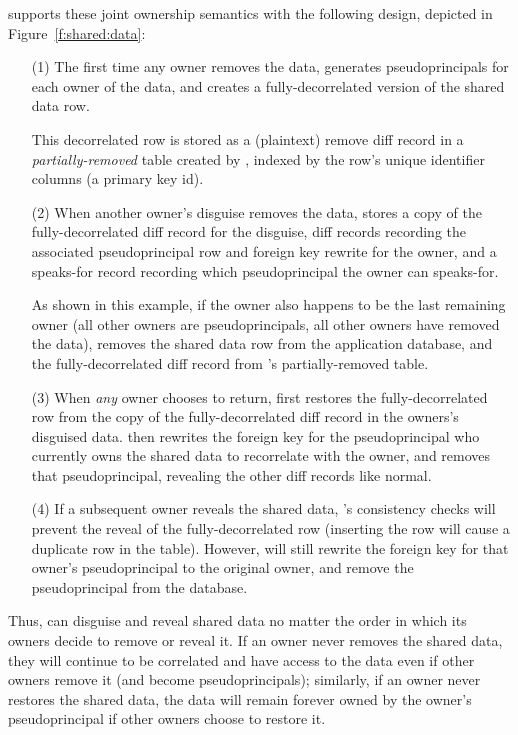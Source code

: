 \sys supports these joint ownership semantics with the following design,
depicted in Figure~\ref{f:shared:data}:
%
\begin{enumerate}
    \item[(1)] The first time any owner removes the data, \sys generates pseudoprincipals for
each owner of the data, and creates a fully-decorrelated version of the shared
data row. 

This decorrelated row is stored as a (plaintext) remove diff record in a
\emph{partially-removed} table created by \sys, indexed by the row's unique
identifier columns (\eg a primary key id).

\item[(2)]
When another owner's disguise removes the data, \sys stores a copy of the
fully-decorrelated diff record for the disguise, diff records recording the
associated pseudoprincipal row and foreign key rewrite for the owner, and a
speaks-for record recording which pseudoprincipal the owner can speaks-for.
%

%
As shown in this example, if the owner also happens to be the last remaining
        owner (all other owners are pseudoprincipals, \ie all other owners have
        removed the data), \sys removes the shared data row from the application
        database, and the fully-decorrelated diff record from \sys's
        partially-removed table.
%

\item[(3)]
When \emph{any} owner chooses to return, \sys first restores the
fully-decorrelated row from the copy of the fully-decorrelated diff record in
the owners's disguised data.  \sys then rewrites the foreign key for the
pseudoprincipal who currently owns the shared data to recorrelate with the
owner, and removes that pseudoprincipal, revealing the other diff records like
normal.
%

\item[(4)] If a subsequent owner reveals the shared data, \sys's consistency checks will
prevent the reveal of the fully-decorrelated row (inserting the row will cause a
duplicate row in the table). However, \sys will still rewrite the foreign key
for that owner's pseudoprincipal to the original owner, and remove the
pseudoprincipal from the database.
%


\end{enumerate}

%



%
Thus, \sys can disguise and reveal shared data no matter the order in which its
owners decide to remove or reveal it. If an owner never removes the shared data,
they will continue to be correlated and have access to the data even if other
owners remove it (and become pseudoprincipals); similarly, if an owner never
restores the shared data, the data will remain forever owned by the owner's
pseudoprincipal if other owners choose to restore it.
%

